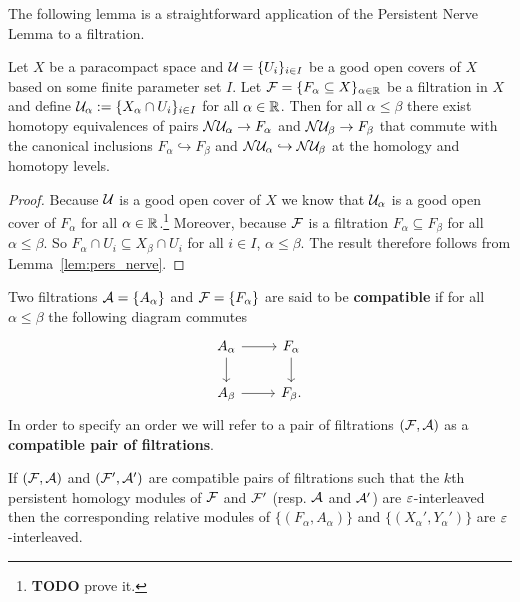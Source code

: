 The following lemma is a straightforward application of the Persistent Nerve Lemma to a filtration.

\begin{lemma}\label{lem:pers_nerve_filt}
  Let $X$ be a paracompact space and $\mathcal{U} = \{U_i\}_{i\in I}$ be a good open covers of $X$ based on some finite parameter set $I$.
  Let $\mathcal{F} = \{F_\alpha\subseteq X\}_{\alpha\in\mathbb{R}}$ be a filtration in $X$ and define $\mathcal{U}_\alpha := \{X_\alpha\cap U_i\}_{i\in I}$ for all $\alpha\in\mathbb{R}$.
  Then for all $\alpha\leq\beta$ there exist homotopy equivalences of pairs $\mathcal{N}\mathcal{U}_\alpha\to F_\alpha$ and $\mathcal{N}\mathcal{U}_\beta\to F_\beta$ that commute with the canonical inclusions $F_\alpha \hookrightarrow F_\beta$ and $\mathcal{N}\mathcal{U}_\alpha\hookrightarrow \mathcal{N}\mathcal{U}_\beta$ at the homology and homotopy levels.
\end{lemma}
\begin{proof}
  Because $\mathcal{U}$ is a good open cover of $X$ we know that $\mathcal{U}_\alpha$ is a good open cover of $F_\alpha$ for all $\alpha\in\mathbb{R}$.\footnote{\textbf{TODO} prove it.}
  Moreover, because $\mathcal{F}$ is a filtration $F_\alpha\subseteq F_\beta$ for all $\alpha\leq\beta$.
  So $F_\alpha\cap U_i\subseteq X_\beta\cap U_i$ for all $i\in I$, $\alpha\leq\beta$.
  The result therefore follows from Lemma~\ref{lem:pers_nerve}.
\end{proof}

\begin{definition}
  Two filtrations $\mathcal{A} = \{A_\alpha\}$ and $\mathcal{F} = \{F_\alpha\}$ are said to be \textbf{compatible} if for all $\alpha\leq\beta$ the following diagram commutes
  \begin{equation}\label{dgm:compatible}
    \begin{tikzcd}
      A_\alpha\arrow{r}\arrow{d} &
      F_\alpha\arrow{d}\\
      A_\beta\arrow{r} &
      F_\beta.
    \end{tikzcd}
  \end{equation}
  In order to specify an order we will refer to a pair of filtrations $(\mathcal{F}, \mathcal{A})$ as a \textbf{compatible pair of filtrations}.
\end{definition}

\begin{theorem}\label{thm:rel_interleave}
  If $(\mathcal{F}, \mathcal{A})$ and $(\mathcal{F}', \mathcal{A}')$ are compatible pairs of filtrations such that the $k$th persistent homology modules of $\mathcal{F}$ and $\mathcal{F}'$ (resp. $\mathcal{A}$ and $\mathcal{A}'$) are $\varepsilon$-interleaved then the corresponding relative modules of $\{(F_\alpha, A_\alpha)\}$ and $\{(X_\alpha', Y_\alpha')\}$ are $\varepsilon$-interleaved.
\end{theorem}

